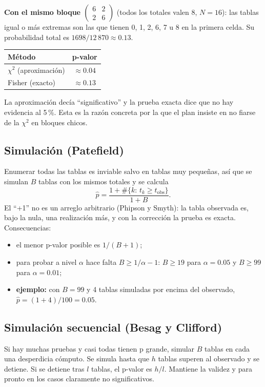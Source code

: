 \documentclass[11pt,a4paper]{article}
\begin{document}
\textbf{Con el mismo bloque $\begin{pmatrix}6&2\\2&6\end{pmatrix}$} (todos los
totales valen 8, $N=16$): las tablas igual o más extremas son las que tienen 0, 1,
2, 6, 7 u 8 en la primera celda. Su probabilidad total es
$1698/12\,870\approx0.13$.
\begin{center}
\begin{tabular}{lc}
\toprule
Método & p-valor \\
\midrule
$\chi^2$ (aproximación) & $\approx0.04$ \\
Fisher (exacto) & $\approx\mathbf{0.13}$ \\
\bottomrule
\end{tabular}
\end{center}
La aproximación decía ``significativo'' y la prueba exacta dice que no hay
evidencia al 5\,\%. Esta es la razón concreta por la que el plan insiste en no
fiarse de la $\chi^2$ en bloques chicos.

\subsection{Simulación (Patefield)}

Enumerar todas las tablas es inviable salvo en tablas muy pequeñas, así que se
simulan $B$ tablas con los mismos totales y se calcula
\[
  \hat p=\frac{1+\#\{k:\,t_k\ge t_{\mathrm{obs}}\}}{1+B}.
\]
El ``+1'' no es un arreglo arbitrario (Phipson y Smyth): la tabla observada es,
bajo la nula, una realización más, y con la corrección la prueba es exacta.
Consecuencias:
\begin{itemize}
  \item el menor p-valor posible es $1/(B+1)$;
  \item para probar a nivel $\alpha$ hace falta $B\ge1/\alpha-1$: $B\ge19$ para
  $\alpha=0.05$ y $B\ge99$ para $\alpha=0.01$;
  \item \textbf{ejemplo:} con $B=99$ y 4 tablas simuladas por encima del observado,
  $\hat p=(1+4)/100=0.05$.
\end{itemize}

\subsection{Simulación secuencial (Besag y Clifford)}

Si hay muchas pruebas y casi todas tienen p grande, simular $B$ tablas en cada una
desperdicia cómputo. Se simula hasta que $h$ tablas superen al observado y se
detiene. Si se detiene tras $l$ tablas, el p-valor es $h/l$. Mantiene la validez y
para pronto en los casos claramente no significativos.
\end{document}
